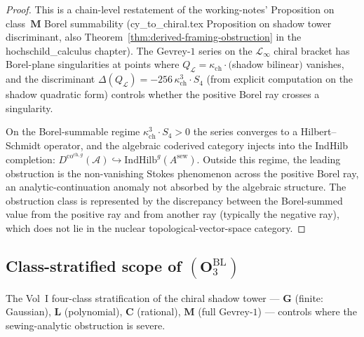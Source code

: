 \documentclass[11pt]{amsart}
\newcommand{\kch}{\kappa_{\mathrm{ch}}}
\newcommand{\cA}{\mathcal{A}}
\newcommand{\cL}{\mathcal{L}}
\newcommand{\Dco}{D^{\mathrm{co}}}
\newcommand{\IndHilb}{\mathrm{IndHilb}}
\begin{document}
\begin{proof}
This is a chain-level restatement of the working-notes'
Proposition on class~$\mathbf{M}$ Borel summability
(cy\_to\_chiral.tex Proposition on shadow tower discriminant,
also Theorem~\ref{thm:derived-framing-obstruction} in the
hochschild\_calculus chapter). The Gevrey-$1$ series on the
$\cL_\infty$ chiral bracket has Borel-plane singularities at
points where $Q_\cL = \kch \cdot ($shadow bilinear$)$ vanishes,
and the discriminant $\Delta(Q_\cL) = -256\,\kch^3 \cdot S_4$
(from explicit computation on the shadow quadratic form)
controls whether the positive Borel ray crosses a singularity.

On the Borel-summable regime $\kch^3 \cdot S_4 > 0$ the series
converges to a Hilbert--Schmidt operator, and the algebraic
coderived category injects into the IndHilb completion:
$\Dco^{\mathrm{ch},g}(\cA) \hookrightarrow \IndHilb^g(A^{\mathrm{sew}})$.
Outside this regime, the leading obstruction is the
non-vanishing Stokes phenomenon across the positive Borel ray,
an analytic-continuation anomaly not absorbed by the algebraic
structure. The obstruction class is represented by the discrepancy
between the Borel-summed value from the positive ray and from
another ray (typically the negative ray), which does not lie in
the nuclear topological-vector-space category.
\end{proof}

\subsection{Class-stratified scope of $(\mathbf{O}_3^{\mathrm{BL}})$}

The Vol~I four-class stratification of the chiral shadow tower
--- $\mathbf{G}$ (finite: Gaussian), $\mathbf{L}$ (polynomial),
$\mathbf{C}$ (rational), $\mathbf{M}$ (full Gevrey-$1$) --- controls
where the sewing-analytic obstruction is severe.
\end{document}
